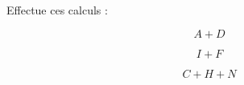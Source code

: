 Effectue ces calculs :
\begin{multicols}{3}
\[A+D\]
\begin{Myenumerate}
\item\dotfill
\item\dotfill
\item\dotfill
\item\dotfill
\item\dotfill
\item\dotfill
\item\dotfill
\item\dotfill
\item\dotfill
\end{Myenumerate}
\par
\[I+F\]
\begin{Myenumerate}
\item\dotfill
\item\dotfill
\item\dotfill
\item\dotfill
\item\dotfill
\item\dotfill
\item\dotfill
\item\dotfill
\item\dotfill
\end{Myenumerate}
\par
\[C+H+N\]
\begin{Myenumerate}
\item\dotfill
\item\dotfill
\item\dotfill
\item\dotfill
\item\dotfill
\item\dotfill
\item\dotfill
\item\dotfill
\item\dotfill
\end{Myenumerate}
\end{multicols}
